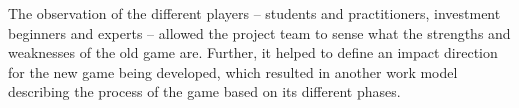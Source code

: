 The observation of the different players – students and practitioners, investment beginners and experts – allowed the project team to sense what the strengths and weaknesses of the old game are. Further, it helped to define an impact direction for the new game being developed, which resulted in another work model describing the process of the game based on its different phases.



